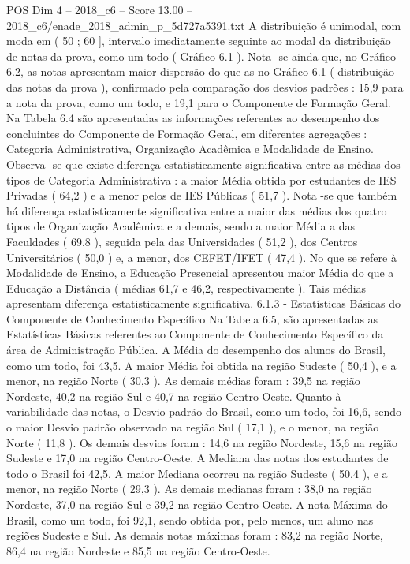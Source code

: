 \begin{textsample}{POS Dim 4 – 2018\_c6 – Score 13.00 – 2018\_c6/enade\_2018\_admin\_p\_5d727a5391.txt}
A distribuição é unimodal, com moda em ( 50 ; 60 ], intervalo imediatamente seguinte ao modal da distribuição de notas da prova, como um todo ( Gráfico 6.1 ).
Nota -se ainda que, no Gráfico 6.2, as notas apresentam maior dispersão do que as no Gráfico 6.1 ( distribuição das notas da prova ), confirmado pela comparação dos desvios padrões : 15,9 para a nota da prova, como um todo, e 19,1 para o Componente de Formação Geral.
Na Tabela 6.4 são apresentadas as informações referentes ao desempenho dos concluintes do Componente de Formação Geral, em diferentes agregações : Categoria Administrativa, Organização Acadêmica e Modalidade de Ensino.
Observa -se que existe diferença estatisticamente significativa entre as médias dos tipos de Categoria Administrativa : a maior Média obtida por estudantes de IES Privadas ( 64,2 ) e a menor pelos de IES Públicas ( 51,7 ).
Nota -se que também há diferença estatisticamente significativa entre a maior das médias dos quatro tipos de Organização Acadêmica e a demais, sendo a maior Média a das Faculdades ( 69,8 ), seguida pela das Universidades ( 51,2 ), dos Centros Universitários ( 50,0 ) e, a menor, dos CEFET/IFET ( 47,4 ).
No que se refere à Modalidade de Ensino, a Educação Presencial apresentou maior Média do que a Educação a Distância ( médias 61,7 e 46,2, respectivamente ).
Tais médias apresentam diferença estatisticamente significativa. 6.1.3 - Estatísticas Básicas do Componente de Conhecimento Específico Na Tabela 6.5, são apresentadas as Estatísticas Básicas referentes ao Componente de Conhecimento Específico da área de Administração Pública.
A Média do desempenho dos alunos do Brasil, como um todo, foi 43,5.
A maior Média foi obtida na região Sudeste ( 50,4 ), e a menor, na região Norte ( 30,3 ).
As demais médias foram : 39,5 na região Nordeste, 40,2 na região Sul e 40,7 na região Centro-Oeste.
Quanto à variabilidade das notas, o Desvio padrão do Brasil, como um todo, foi 16,6, sendo o maior Desvio padrão observado na região Sul ( 17,1 ), e o menor, na região Norte ( 11,8 ).
Os demais desvios foram : 14,6 na região Nordeste, 15,6 na região Sudeste e 17,0 na região Centro-Oeste.
A Mediana das notas dos estudantes de todo o Brasil foi 42,5.
A maior Mediana ocorreu na região Sudeste ( 50,4 ), e a menor, na região Norte ( 29,3 ).
As demais medianas foram : 38,0 na região Nordeste, 37,0 na região Sul e 39,2 na região Centro-Oeste.
A nota Máxima do Brasil, como um todo, foi 92,1, sendo obtida por, pelo menos, um aluno nas regiões Sudeste e Sul.
As demais notas máximas foram : 83,2 na região Norte, 86,4 na região Nordeste e 85,5 na região Centro-Oeste.

\end{textsample}
